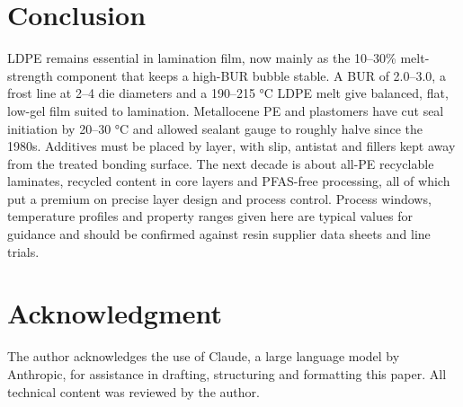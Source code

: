 \documentclass[10pt,twocolumn,a4paper]{article}
\begin{document}
\section{Conclusion}

LDPE remains essential in lamination film, now mainly as the 10–30\% melt-strength component that keeps a high-BUR bubble stable. A BUR of 2.0–3.0, a frost line at 2–4 die diameters and a 190–215 °C LDPE melt give balanced, flat, low-gel film suited to lamination. Metallocene PE and plastomers have cut seal initiation by 20–30 °C and allowed sealant gauge to roughly halve since the 1980s. Additives must be placed by layer, with slip, antistat and fillers kept away from the treated bonding surface. The next decade is about all-PE recyclable laminates, recycled content in core layers and PFAS-free processing, all of which put a premium on precise layer design and process control. Process windows, temperature profiles and property ranges given here are typical values for guidance and should be confirmed against resin supplier data sheets and line trials.

\section*{Acknowledgment}

The author acknowledges the use of Claude, a large language model by Anthropic, for assistance in drafting, structuring and formatting this paper. All technical content was reviewed by the author.
\end{document}
